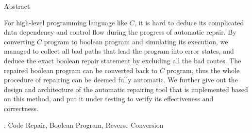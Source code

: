 \begin{center}
\label{section:Abstract}
{\Large Abstract}
\end{center}

For high-level programming language like $C$, it is hard to deduce its complicated data dependency and control flow during the progress of automatic repair.
By converting $C$ program to boolean program and simulating its execution, we managed to collect all bad paths that lead the program into error states, and deduce the exact boolean repair statement by excluding all the bad routes. The repaired boolean program can be converted back to $C$ program, thus the whole procedure of repairing can be deemed fully automatic.
We further give out the design and architecture of the automatic repairing tool that is implemented based on this method, and put it under testing to verify its effectiveness and correctness.

\emptyline
: Code Repair, Boolean Program, Reverse Conversion